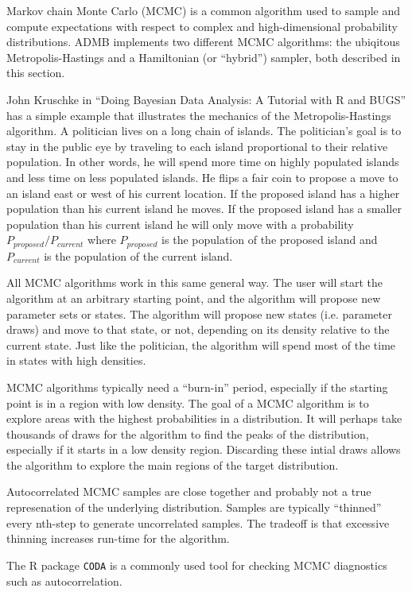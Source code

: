 \documentclass{article}\usepackage[]{graphicx}\usepackage[]{color}
\begin{document}
Markov chain Monte Carlo (MCMC) is a common algorithm used
to sample and compute expectations with respect to complex
and high-dimensional probability distributions.  ADMB
implements two different MCMC algorithms: the ubiqitous
Metropolis-Hastings and a Hamiltonian (or ``hybrid'')
sampler, both described in this section.

John Kruschke in ``Doing Bayesian Data Analysis: A Tutorial
with R and BUGS'' has a simple example that illustrates the
mechanics of the Metropolis-Hastings algorithm. A politician
lives on a long chain of islands. The politician's goal is
to stay in the public eye by traveling to each island
proportional to their relative population. In other words,
he will spend more time on highly populated islands and less
time on less populated islands. He flips a fair coin to
propose a move to an island east or west of his current
location. If the proposed island has a higher population
than his current island he moves. If the proposed island has
a smaller population than his current island he will only
move with a probability $P_{proposed} / P_{current}$ where
$P_{proposed}$ is the population of the proposed island and
$P_{current}$ is the population of the current island.

All MCMC algorithms work in this same general way. The user
will start the algorithm at an arbitrary starting point, and
the algorithm will propose new parameter sets or states. The
algorithm will propose new states (i.e. parameter draws) and
move to that state, or not, depending on its density
relative to the current state. Just like the politician, the
algorithm will spend most of the time in states with high
densities.

MCMC algorithms typically need a ``burn-in'' period,
especially if the starting point is in a region with low
density. The goal of a MCMC algorithm is to explore areas
with the highest probabilities in a distribution. It will
perhaps take thousands of draws for the algorithm to find
the peaks of the distribution, especially if it starts in a
low density region. Discarding these intial draws allows the
algorithm to explore the main regions of the target
distribution.

Autocorrelated MCMC samples are close together and probably
not a true represenation of the underlying
distribution. Samples are typically ``thinned'' every
nth-step to generate uncorrelated samples. The tradeoff is
that excessive thinning increases run-time for the
algorithm.

The R package \texttt{CODA} is a commonly used tool for
checking MCMC diagnostics such as autocorrelation.
\end{document}
